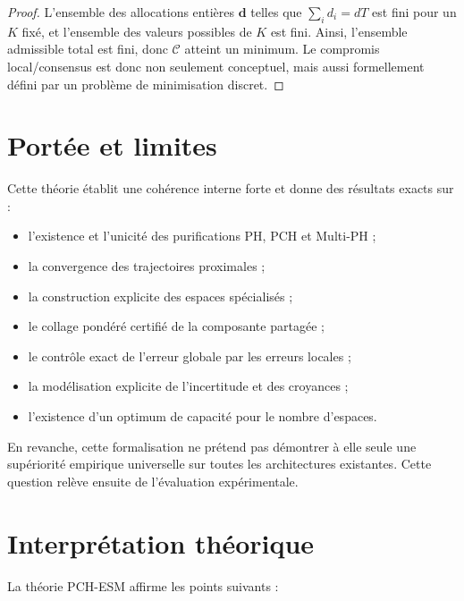 \documentclass[11pt,a4paper]{article}
\newcommand{\1}{\mathbf 1}
\begin{document}
\begin{proof}
L'ensemble des allocations entières \(\mathbf d\) telles que \(\sum_i d_i=dT\) est fini pour un \(K\) fixé, et l'ensemble des valeurs possibles de \(K\) est fini.  
Ainsi, l'ensemble admissible total est fini, donc \(\mathcal C\) atteint un minimum.  
Le compromis local/consensus est donc non seulement conceptuel, mais aussi formellement défini par un problème de minimisation discret.
\end{proof}

\section{Portée et limites}

Cette théorie établit une cohérence interne forte et donne des résultats exacts sur :
\begin{itemize}[leftmargin=2em]
    \item l'existence et l'unicité des purifications PH, PCH et Multi-PH ;
    \item la convergence des trajectoires proximales ;
    \item la construction explicite des espaces spécialisés ;
    \item le collage pondéré certifié de la composante partagée ;
    \item le contrôle exact de l'erreur globale par les erreurs locales ;
    \item la modélisation explicite de l'incertitude et des croyances ;
    \item l'existence d'un optimum de capacité pour le nombre d'espaces.
\end{itemize}

En revanche, cette formalisation ne prétend pas démontrer à elle seule une supériorité empirique universelle sur toutes les architectures existantes.  
Cette question relève ensuite de l'évaluation expérimentale.

\section{Interprétation théorique}

La théorie PCH-ESM affirme les points suivants :
\end{document}
